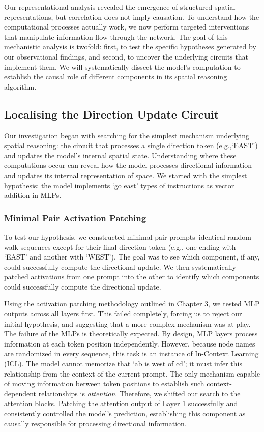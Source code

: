 Our representational analysis revealed the emergence of structured spatial representations, but correlation does not imply causation. To understand how the computational processes actually work, we now perform targeted interventions that manipulate information flow through the network. The goal of this mechanistic analysis is twofold: first, to test the specific hypotheses generated by our observational findings, and second, to uncover the underlying circuits that implement them. We will systematically dissect the model's computation to establish the causal role of different components in its spatial reasoning algorithm.

\subsection{Localising the Direction Update Circuit}

Our investigation began with searching for the simplest mechanism underlying spatial reasoning: the circuit that processes a single direction token (e.g.,`EAST') and updates the model’s internal spatial state. Understanding where these computations occur can reveal how the model processes directional information and updates its internal representation of space. We started with the simplest hypothesis: the model implements `go east' types of instructions as vector addition in MLPs.

\subsubsection{Minimal Pair Activation Patching}

To test our hypothesis, we constructed minimal pair prompts--identical random walk sequences except for their final direction token (e.g., one ending with `EAST' and another with `WEST'). The goal was to see which component, if any, could successfully compute the directional update. We then systematically patched activations from one prompt into the other to identify which components could successfully compute the directional update.

Using the activation patching methodology outlined in Chapter 3, we tested MLP outputs across all layers first. This failed completely, forcing us to reject our initial hypothesis, and suggesting that a more complex mechanism was at play. The failure of the MLPs is theoretically expected. By design, MLP layers process information at each token position independently. However, because node names are randomized in every sequence, this task is an instance of In-Context Learning (ICL). The model cannot memorize that `ab is west of cd'; it must infer this relationship from the context of the current prompt. The only mechanism capable of moving information between token positions to establish such context-dependent relationships is \textit{attention}. Therefore, we shifted our search to the attention blocks. Patching the attention output of Layer 1 successfully and consistently controlled the model's prediction, establishing this component as causally responsible for processing directional information.

